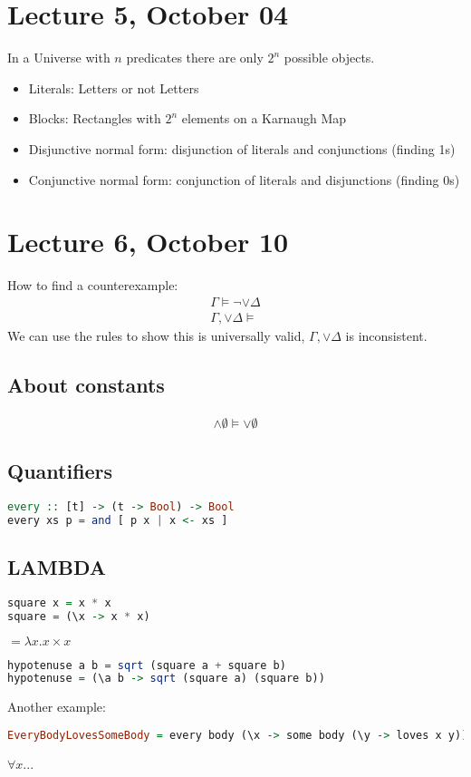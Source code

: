 \documentclass{article}
\newcounter{example}[section]\setcounter{example}{0}
\theoremstyle{sltheorem}
\begin{document}
\section{Lecture 5, October 04}
In a Universe with $n$ predicates there are only $2^n$ possible objects.\\
\begin{itemize}
    \item Literals: Letters or not Letters
    \item Blocks: Rectangles with $2^n$ elements on a Karnaugh Map
    \item Disjunctive normal form: disjunction of literals and conjunctions (finding 1s)
    \item Conjunctive normal form: conjunction of literals and disjunctions (finding 0s)
\end{itemize}
\section{Lecture 6, October 10}
How to find a counterexample:
\begin{align}
    \Gamma \vDash \neg \vee \Delta\\
    \Gamma, \vee \Delta \vDash
\end{align}
We can use the rules to show this is universally valid, $\Gamma, \vee \Delta$ is inconsistent.
\subsection{About constants}
\begin{align}
    \wedge \emptyset \vDash \vee \emptyset
\end{align}
\subsection{Quantifiers}
\begin{lstlisting}[language=haskell]
every :: [t] -> (t -> Bool) -> Bool
every xs p = and [ p x | x <- xs ]
\end{lstlisting}
\subsection{LAMBDA}
\begin{lstlisting}[language=haskell]
square x = x * x
square = (\x -> x * x)
\end{lstlisting}
$=\lambda x.x \times x$
\begin{lstlisting}[language=haskell]
hypotenuse a b = sqrt (square a + square b)
hypotenuse = (\a b -> sqrt (square a) (square b))
\end{lstlisting}
Another example:
\begin{lstlisting}[language=haskell]
EveryBodyLovesSomeBody = every body (\x -> some body (\y -> loves x y))
\end{lstlisting}
$\forall x $... \\ 
\end{document}
